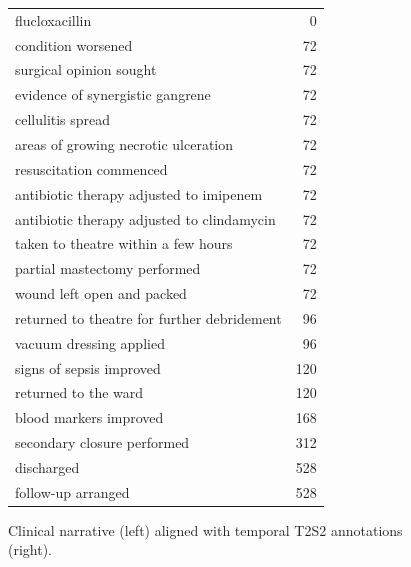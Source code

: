 \begin{figure}[htbp]
\begin{ChSixFloatBody}
\begin{tcolorbox}
\begin{minipage}[t]{0.48\textwidth}
\begin{tcolorbox}[ChSix/annobox,title={T2S2 annotation}]
\begin{tabular}{>{\raggedright\arraybackslash}p{} r}
flucloxacillin & 0 \\
condition worsened & 72 \\
surgical opinion sought & 72 \\
evidence of synergistic gangrene & 72 \\
cellulitis spread & 72 \\
areas of growing necrotic ulceration & 72 \\
resuscitation commenced & 72 \\
antibiotic therapy adjusted to imipenem & 72 \\
antibiotic therapy adjusted to clindamycin & 72 \\
taken to theatre within a few hours & 72 \\
partial mastectomy performed & 72 \\
wound left open and packed & 72 \\
returned to theatre for further debridement & 96 \\
vacuum dressing applied & 96 \\
signs of sepsis improved & 120 \\
returned to the ward & 120 \\
blood markers improved & 168 \\
secondary closure performed & 312 \\
discharged & 528 \\
follow-up arranged & 528 \\
\bottomrule
\end{tabular}
\end{tcolorbox}
\end{minipage}

\end{tcolorbox}




\end{ChSixFloatBody}
\caption{Clinical narrative (left) aligned with temporal T2S2 annotations (right).}
\end{figure}